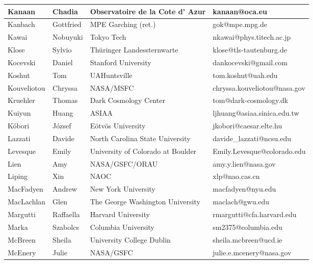 \begin{center}
\begin{longtable}{|p{1.28cm} |p{1.28cm} |p{2.9cm} |p{3cm} |}
\tiny Kanaan &\tiny Chadia & \tiny Observatoire de la Cote d' Azur & \tiny kanaan@oca.eu \\ \hline
\tiny Kanbach &\tiny Gottfried & \tiny MPE Garching (ret.) & \tiny gok@mpe.mpg.de \\ \hline
\tiny Kawai &\tiny Nobuyuki & \tiny Tokyo Tech & \tiny nkawai@phys.titech.ac.jp \\ \hline
\tiny Klose &\tiny Sylvio & \tiny Th\"uringer Landessternwarte & \tiny klose@tls-tautenburg.de \\ \hline
\tiny Kocevski &\tiny Daniel & \tiny Stanford University & \tiny dankocevski@gmail.com \\ \hline
\tiny Koshut &\tiny Tom & \tiny UAHuntsville & \tiny tom.koshut@uah.edu \\ \hline
\tiny Kouveliotou &\tiny Chryssa & \tiny NASA/MSFC & \tiny chryssa.kouveliotou@nasa.gov \\ \hline
\tiny Kruehler &\tiny Thomas & \tiny Dark Cosmology Center & \tiny tom@dark-cosmology.dk \\ \hline
\tiny Kuiyun &\tiny Huang & \tiny ASIAA & \tiny ljhuang@asiaa.sinica.edu.tw \\ \hline
\tiny K\'obori &\tiny J\'ozsef & \tiny E\"otv\"os University & \tiny jkobori@caesar.elte.hu \\ \hline
\tiny Lazzati &\tiny Davide & \tiny North Carolina State University & \tiny davide\_lazzati@ncsu.edu \\ \hline
\tiny Levesque &\tiny Emily & \tiny University of Colorado at Boulder & \tiny Emily.Levesque@colorado.edu \\ \hline
\tiny Lien &\tiny Amy & \tiny NASA/GSFC/ORAU & \tiny amy.y.lien@nasa.gov \\ \hline
\tiny Liping &\tiny Xin & \tiny NAOC & \tiny xlp@nao.cas.cn \\ \hline
\tiny MacFadyen &\tiny Andrew & \tiny New York University & \tiny macfadyen@nyu.edu \\ \hline
\tiny MacLachlan &\tiny Glen & \tiny The George Washington University & \tiny maclach@gwu.edu \\ \hline
\tiny Margutti &\tiny Raffaella & \tiny Harvard University & \tiny rmargutti@cfa.harvard.edu \\ \hline
\tiny Marka &\tiny Szabolcs & \tiny Columbia University & \tiny sm2375@columbia.edu \\ \hline
\tiny McBreen &\tiny Sheila & \tiny University College Dublin & \tiny sheila.mcbreen@ucd.ie \\ \hline
\tiny McEnery &\tiny Julie & \tiny NASA/GSFC & \tiny julie.e.mcenery@nasa.gov \\ \hline

\end{longtable}
\end{center}
